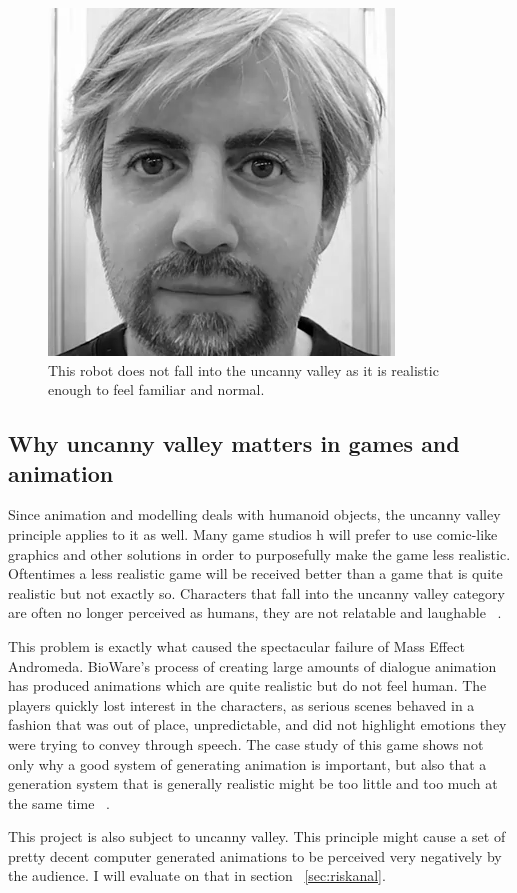 \begin{figure}[H]
\centerline{\includegraphics[scale=0.45]{img/realrobot.png}}
\caption{This robot does not fall into the uncanny valley as it is realistic enough to feel familiar and normal.}\label{fig:realrobot}
\end{figure}

\subsection{Why uncanny valley matters in games and animation}

Since animation and modelling deals with humanoid objects, the uncanny valley principle applies to it as well. Many game studios h will prefer to use comic-like graphics and other solutions in order to purposefully make the game less realistic. Oftentimes a less realistic game will be received better than a game that is quite realistic but not exactly so. Characters that fall into the uncanny valley category are often no longer perceived as humans, they are not relatable and laughable ~\cite{uncannygames}.

This problem is exactly what caused the spectacular failure of Mass Effect Andromeda. BioWare's  process of creating large amounts of dialogue animation has produced animations which are quite realistic but do not feel human. The players quickly lost interest in the characters, as serious scenes behaved in a fashion that was out of place, unpredictable, and did not highlight emotions they were trying to convey through speech. The case study of this game shows not only why a good system of generating animation is important, but also that a generation system that is generally realistic might be too little and too much at the same time ~\cite{uncannyandromeda}.

This project is also subject to uncanny valley. This principle might cause a set of pretty decent computer generated animations to be perceived very negatively by the audience. I will evaluate on that in section ~\ref{sec:riskanal}.






